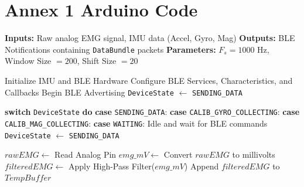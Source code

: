 
%


\chapter{Annex 1 Arduino Code}
\label{ann:arduino_code}

\begin{algorithm}
\caption{Wearable Sensor Data Acquisition and BLE Transmission}
\label{alg:data_acq}
\begin{algorithmic}[1]
\State \textbf{Inputs:} Raw analog EMG signal, IMU data (Accel, Gyro, Mag)
\State \textbf{Outputs:} BLE Notifications containing \texttt{DataBundle} packets
\State \textbf{Parameters:} $F_s = 1000$ Hz, Window Size $= 200$, Shift Size $= 20$
\vspace{0.2cm}

    \State Initialize IMU and BLE Hardware
    \State Configure BLE Services, Characteristics, and Callbacks
    \State Begin BLE Advertising
    \State \texttt{DeviceState} $\gets$ \texttt{SENDING\_DATA}
\EndProcedure
\vspace{0.2cm}

            \State \textbf{switch} \texttt{DeviceState} \textbf{do}
            \State \quad \textbf{case} \texttt{SENDING\_DATA}: 
            \State \quad \textbf{case} \texttt{CALIB\_GYRO\_COLLECTING}: 
            \State \quad \textbf{case} \texttt{CALIB\_MAG\_COLLECTING}: 
            \State \quad \textbf{case} \texttt{WAITING}: Idle and wait for BLE commands
        \Else
            \State \texttt{DeviceState} $\gets$ \texttt{SENDING\_DATA}
        \EndIf
    \EndWhile
\EndProcedure
\vspace{0.2cm}

        \State $rawEMG \gets$ Read Analog Pin
        \State $emg\_mV \gets$ Convert $rawEMG$ to millivolts
        \State $filteredEMG \gets$ Apply High-Pass Filter($emg\_mV$)
        \State Append $filteredEMG$ to $TempBuffer$
        

\end{algorithmic}
\end{algorithm}
